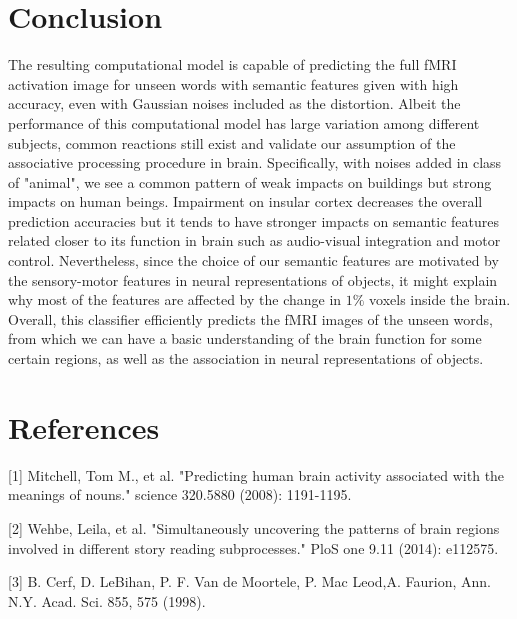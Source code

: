 \documentclass{article}
\begin{document}
\section{Conclusion}
The resulting computational model is capable of predicting the full fMRI activation image for unseen words with semantic features given with high accuracy, even with Gaussian noises included as the distortion. Albeit the performance of this computational model has large variation among different subjects, common reactions still exist and validate our assumption of the associative processing procedure in brain. Specifically, with noises added in class of "animal", we see a common pattern of weak impacts on buildings but strong impacts on human beings. Impairment on insular cortex decreases the overall prediction accuracies but it tends to have stronger impacts on semantic features related closer to its function in brain such as audio-visual integration and motor control. Nevertheless, since the choice of our semantic features are motivated by the sensory-motor features in neural representations of objects, it might explain why most of the features are affected by the change in $1\%$ voxels inside the brain. Overall, this classifier efficiently predicts the fMRI images of the unseen words, from which we can have a basic understanding of the brain function for some certain regions, as well as the association in neural representations of objects.









\section*{References}
[1] Mitchell, Tom M., et al. "Predicting human brain activity associated with the meanings of nouns." science 320.5880 (2008): 1191-1195.  

[2] Wehbe, Leila, et al. "Simultaneously uncovering the patterns of brain regions involved in different story reading subprocesses." PloS one 9.11 (2014): e112575.

[3] B. Cerf, D. LeBihan, P. F. Van de Moortele, P. Mac Leod,A. Faurion, Ann. N.Y. Acad. Sci. 855, 575 (1998).
\end{document}

